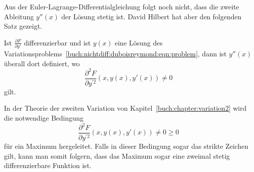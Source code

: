 Aus der Euler-Lagrange-Differentialgleichung folgt noch nicht, dass
die zweite Ableitung $y''(x)$ der Lösung stetig ist.
David Hilbert hat aber den folgenden Satz gezeigt.

\begin{satz}
Ist $\frac{\partial F}{\partial y'}$ differenzierbar und ist $y(x)$ eine
Lösung des Variationsproblems~\eqref{buch:nichtdiff:duboisreymond:eqn:problem},
dann ist $y''(x)$ überall dort definiert, wo
\[
\frac{\partial^2 F}{\partial y^{\prime 2}}(x,y(x),y'(x)) \ne 0
\]
gilt.
\end{satz}


In der Theorie der zweiten Variation von Kapitel~\ref{buch:chapter:variation2}
wird die notwendige Bedingung
\[
\frac{\partial^2 F}{\partial y^{\prime 2}}(x,y(x),y'(x)) \ne 0
\ge 0
\]
für ein Maximum hergeleitet.
Falls in dieser Bedingung sogar das strikte Zeichen gilt, kann man
somit folgern, dass das Maximum sogar eine zweimal stetig differenzierbare
Funktion ist.




